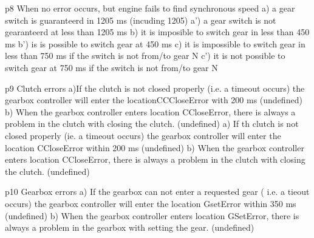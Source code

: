 p8 When no error occurs, but engine fails to find synchronous speed
a) a gear switch is guaranteerd in 1205 ms (incuding 1205)
a') a gear switch is not gearanteerd at less than 1205 ms
b) it is imposible to switch gear in less than 450 ms
b') is is possible to switch gear at 450 ms
c) it is impossible to switch gear in less than 750 ms if the switch is not from/to gear N
c') it is not possible to switch gear at 750 ms if the switch is not from/to gear N


p9 Clutch errors
a)If the clutch is not closed properly (i.e. a timeout occurs) the gearbox  controller will enter the locationCCCloseError with 200 ms   (undefined)
b)  When the gearbox controller enters location CCloseError, there is always a problem in the clutch with closing the clutch.  (undefined)
a) If th clutch is not closed properly (ie. a timeout occurs) the gearbox controller will enter the location CCloseError within 200 ms (undefined)
b) When the gearbox controller enters location CCloseError, there is always a problem in the clutch with closing the clutch. (undefined)


p10 Gearbox errors  
a) If the gearbox can not enter a requested gear ( i.e. a tieout occurs) the gearbox controller will enter the location GsetError within 350 ms (undefined)
b) When the gearbox controller enters location GSetError, there is always a problem in the gearbox with setting the gear. (undefined)


